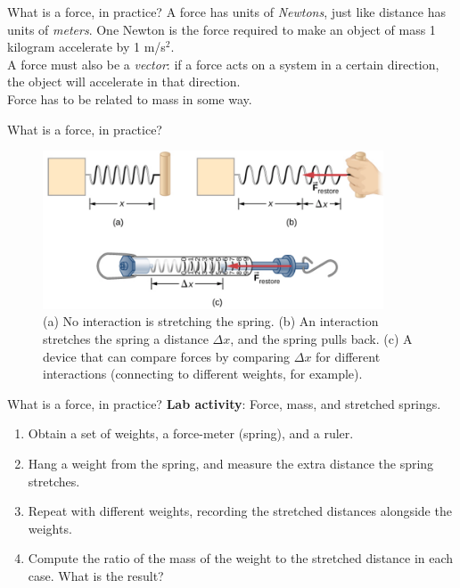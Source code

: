 \documentclass{beamer}
\begin{document}
\begin{frame}{What is a force, in practice?}
A force has units of \textit{Newtons}, just like distance has units of \textit{meters}.  One Newton is the force required to make an object of mass 1 kilogram accelerate by 1 m/s$^2$.\\
\vspace{1cm}
A force must also be a \textit{vector}: if a force acts on a system in a certain direction, the object will accelerate in that direction. \\
\vspace{1cm}
Force has to be related to mass in some way.
\end{frame}

\begin{frame}{What is a force, in practice?}
\small
\begin{figure}
\centering
\includegraphics[width=0.9\textwidth]{figures/force1.png}
\caption{\label{fig:force1} (a) No interaction is stretching the spring.  (b) An interaction stretches the spring a distance $\Delta x$, and the spring pulls back.  (c) A device that can compare forces by comparing $\Delta x$ for different interactions (connecting to different weights, for example).}
\end{figure}
\end{frame}

\begin{frame}{What is a force, in practice?}
\textbf{Lab activity}: Force, mass, and stretched springs.
\begin{enumerate}
\item Obtain a set of weights, a force-meter (spring), and a ruler.
\item Hang a weight from the spring, and measure the extra distance the spring stretches.
\item Repeat with different weights, recording the stretched distances alongside the weights.
\item Compute the ratio of the mass of the weight to the stretched distance in each case.  What is the result?
\end{enumerate}
\end{frame}
\end{document}
